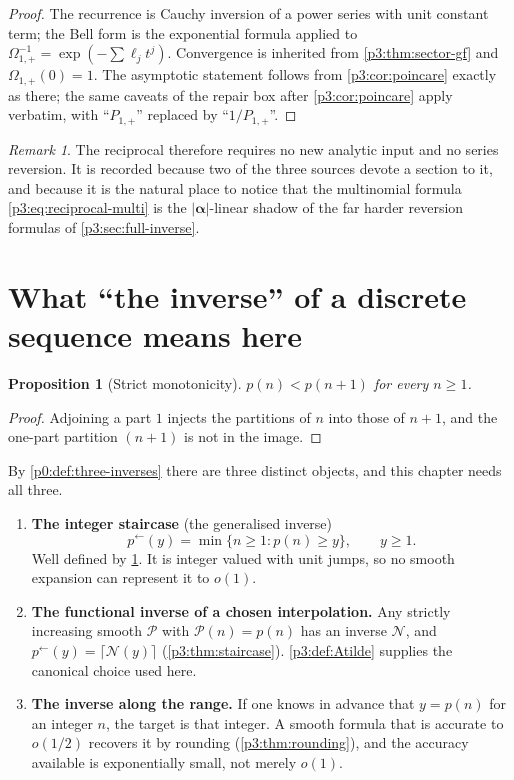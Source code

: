 \documentclass[11pt,a4paper,oneside]{book}
\theoremstyle{plain}
\newtheorem{proposition}[theorem]{Proposition}
\theoremstyle{definition}
\theoremstyle{remark}
\newtheorem{remark}[theorem]{Remark}
\newcommand{\littleo}{o}
\begin{document}
\begin{proof}
The recurrence is Cauchy inversion of a power series with unit constant term; the Bell form is the
exponential formula applied to $\Omega_{1,+}^{-1}=\exp(-\sum\ell_{j}t^{j})$. Convergence is
inherited from \cref{p3:thm:sector-gf} and $\Omega_{1,+}(0)=1$. The asymptotic statement follows
from \cref{p3:cor:poincare} exactly as there; the same caveats of the repair box after
\cref{p3:cor:poincare} apply verbatim, with ``$P_{1,+}$'' replaced by ``$1/P_{1,+}$''.
\end{proof}

\begin{remark}
The reciprocal therefore requires no new analytic input and no series reversion. It is recorded
because two of the three sources devote a section to it, and because it is the natural place to
notice that the multinomial formula \cref{p3:eq:reciprocal-multi} is the
$|\boldsymbol\alpha|$-linear shadow of the far harder reversion formulas of
\cref{p3:sec:full-inverse}.
\end{remark}

\section{What ``the inverse'' of a discrete sequence means here}
\label{p3:sec:meaning}

\begin{proposition}[Strict monotonicity]\label{p3:prop:strict-increase}
$p(n)<p(n+1)$ for every $n\ge1$.
\end{proposition}

\begin{proof}
Adjoining a part $1$ injects the partitions of $n$ into those of $n+1$, and the one-part partition
$(n+1)$ is not in the image.
\end{proof}

By \cref{p0:def:three-inverses} there are three distinct objects, and this chapter needs all
three.

\begin{enumerate}
\item \textbf{The integer staircase} (the generalised inverse)
      \begin{equation}\label{p3:eq:staircase-def}
       p^{\leftarrow}(y)=\min\{n\ge1:p(n)\ge y\},\qquad y\ge1 .
      \end{equation}
Well defined by \cref{p3:prop:strict-increase}. It is integer valued with unit jumps, so no smooth
expansion can represent it to $\littleo(1)$.
\item \textbf{The functional inverse of a chosen interpolation.}  Any strictly
increasing smooth $\mathcal{P}$ with $\mathcal{P}(n)=p(n)$ has an inverse $\mathcal{N}$, and
$p^{\leftarrow}(y)=\lceil\mathcal{N}(y)\rceil$ (\cref{p3:thm:staircase}). \cref{p3:def:Atilde}
supplies the canonical choice used here.
\item \textbf{The inverse along the range.}  If one knows in advance that
$y=p(n)$ for an integer $n$, the target is that integer. A smooth formula that is accurate to
$\littleo(1/2)$ recovers it by rounding (\cref{p3:thm:rounding}), and the accuracy available is
exponentially small, not merely $\littleo(1)$.
\end{enumerate}
\end{document}

